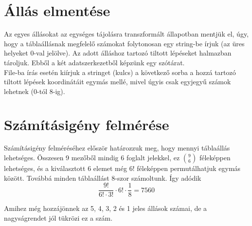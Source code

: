 \documentclass[a4paper, 11pt]{article}
\begin{document}
\section{Állás elmentése}
\indent Az egyes állásokat az egységes tájolásra transzformált állapotban mentjük el, úgy, hogy a táblaállásnak megfelelő számokat folytonosan egy string-be írjuk (az üres helyeket 0-val jelölve). Az adott álláshoz tartozó tiltott lépéseket halmazban tároljuk. Ebből a két adatszerkezetből képzünk egy szótárat. \\
\indent File-ba írás esetén kiírjuk a stringet (kulcs) a következő sorba a hozzá tartozó tiltott lépések koordinátáit egymás mellé, mivel úgyis csak egyjegyű számok lehetnek (0-tól 8-ig).





\pagebreak
\section{Számításigény felmérése}
\indent Számításigény felméréséhez először határozzuk meg, hogy mennyi táblaállás lehetséges. Összesen 9 mezőből mindig 6 foglalt jelekkel, ez ${9 \choose 6}$ féleképpen lehetséges, és a kiválasztott 6 elemet még $6!$ féleképpen permutálhatjuk egymás között. Továbbá minden táblaállást 8-szor számoltunk. Így adódik
\begin{equation}
    \frac{9!}{6!\cdot3!} \cdot 6! \cdot \frac{1}{8} = 7560
\end{equation}

Amihez még hozzájönnek az 5, 4, 3, 2 és 1 jeles állások számai, de a nagyságrendet jól tükrözi ez a szám.
\end{document}
